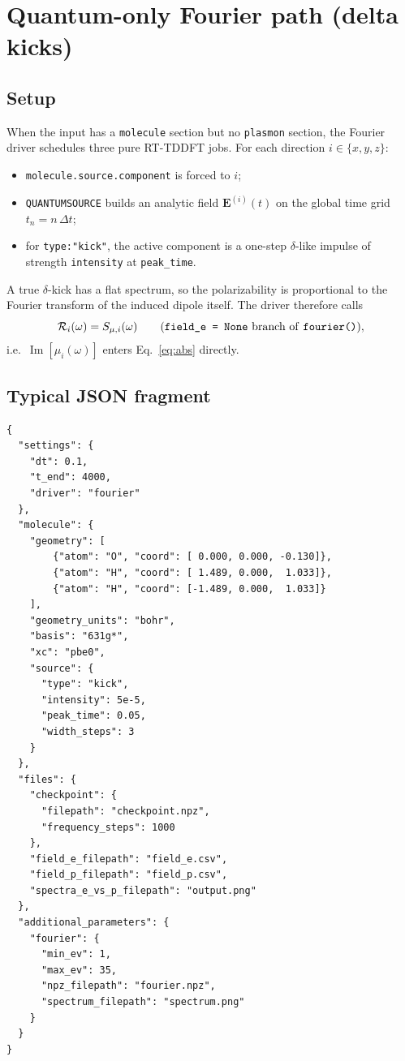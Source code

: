 \documentclass[11pt,a4paper]{article}
\begin{document}
\section{Quantum-only Fourier path (delta kicks)}
\label{sec:qm}

\subsection{Setup}

When the input has a \texttt{molecule} section but no \texttt{plasmon}
section, the Fourier driver schedules three pure RT-TDDFT jobs.
For each direction $i\in\{x,y,z\}$:
\begin{itemize}
  \item \texttt{molecule.source.component} is forced to $i$;
  \item \texttt{QUANTUMSOURCE} builds an analytic field
        $\mathbf{E}^{(i)}(t)$ on the global time grid
        $t_n = n\,\Delta t$;
  \item for \texttt{type:"kick"}, the active component is a one-step
        $\delta$-like impulse of strength
        \texttt{intensity} at \texttt{peak\_time}.
\end{itemize}

\noindent A true $\delta$-kick has a flat spectrum, so the polarizability is
proportional to the Fourier transform of the induced dipole itself.  The
driver therefore calls
\begin{equation}
  \mathcal{R}_i(\omega) = S_{\mu,i}(\omega)
  \qquad\text{(\texttt{field\_e = None} branch of \texttt{fourier()})},
\end{equation}
i.e.\ $\operatorname{Im}[\mu_i(\omega)]$ enters Eq.~\eqref{eq:abs} directly.

\subsection{Typical JSON fragment}

\begin{lstlisting}[language={}]
{
  "settings": {
    "dt": 0.1,
    "t_end": 4000,
    "driver": "fourier"
  },
  "molecule": {
    "geometry": [
        {"atom": "O", "coord": [ 0.000, 0.000, -0.130]},
        {"atom": "H", "coord": [ 1.489, 0.000,  1.033]},
        {"atom": "H", "coord": [-1.489, 0.000,  1.033]}
    ],
    "geometry_units": "bohr",
    "basis": "631g*",
    "xc": "pbe0",
    "source": {
      "type": "kick",
      "intensity": 5e-5,
      "peak_time": 0.05,
      "width_steps": 3
    }
  },
  "files": {
    "checkpoint": {
      "filepath": "checkpoint.npz",
      "frequency_steps": 1000
    },
    "field_e_filepath": "field_e.csv",
    "field_p_filepath": "field_p.csv",
    "spectra_e_vs_p_filepath": "output.png"
  },
  "additional_parameters": {
    "fourier": {
      "min_ev": 1,
      "max_ev": 35,
      "npz_filepath": "fourier.npz",
      "spectrum_filepath": "spectrum.png"
    }
  }
}
\end{lstlisting}
\end{document}
